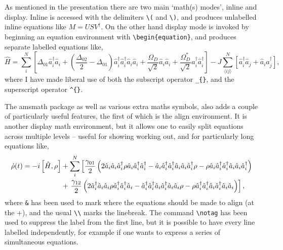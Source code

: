 \documentclass[a4paper,11pt,twoside]{article}		%
\begin{document}
As mentioned in the presentation there are two main `math(s) modes', inline and display. Inline is accessed with the delimiters \verb:\(: and \verb:\):, and produces unlabelled inline equations like \(M = USV^{\dagger}\). On the other hand display mode is invoked by beginning an equation environment with \verb:\begin{equation}:, and produces separate labelled equations like,
\begin{equation}
\hat{H} = \sum_{i}^{N} \left[ \Delta_{01}\hat{a}_{i}^{\dagger}\hat{a}_{i} + \left(\frac{\Delta_{02}}{2} - \Delta_{01}\right)\hat{a}_{i}^{\dagger}\hat{a}_{i}^{\dagger}\hat{a}_{i}\hat{a}_{i} + \frac{\Omega_{D}}{\sqrt{2}}\hat{a}_{i}\hat{a}_{i} + \frac{\Omega_{D}^{*}}{\sqrt{2}}\hat{a}_{i}^{\dagger}\hat{a}_{i}^{\dagger} \right] - J\sum_{\langle ij \rangle}^{N} \left[ \hat{a}_{i}^{\dagger}\hat{a}_{j} + \hat{a}_{i}\hat{a}_{j}^{\dagger}\right],
\label{eq:1}
\end{equation}
where I have made liberal use of both the subscript operator \verb:_{}:, and the superscript operator \verb:^{}:. 

The amsmath package as well as various extra maths symbols, also adds a couple of particularly useful features, the first of which is the align environment. It is another display math environment, but it allows one to easily split equations across multiple levels -- useful for showing working out, and for particularly long equations like,
\begin{align}
\dot{\rho}(t) = -i\left[ \hat{H}, \rho \right] &+ \sum_{i}^{N} \left[ \frac{\gamma_{01}}{2}\left(2\hat{a}_{i}\hat{a}_{i}\hat{a}_{i}^{\dagger} \rho \hat{a}_{i}\hat{a}_{i}^{\dagger}\hat{a}_{i}^{\dagger} - \hat{a}_{i}\hat{a}_{i}^{\dagger}\hat{a}_{i}^{\dagger} \hat{a}_{i}\hat{a}_{i}\hat{a}_{i}^{\dagger} \rho - \rho \hat{a}_{i}\hat{a}_{i}^{\dagger}\hat{a}_{i}^{\dagger} \hat{a}_{i}\hat{a}_{i}\hat{a}_{i}^{\dagger}\right) \right. \notag \\
&+ \left. \frac{\gamma_{12}}{2} \left(2 \hat{a}_{i}^{\dagger}\hat{a}_{i}\hat{a}_{i} \rho \hat{a}_{i}^{\dagger}\hat{a}_{i}^{\dagger}\hat{a}_{i} - \hat{a}_{i}^{\dagger}\hat{a}_{i}^{\dagger}\hat{a}_{i} \hat{a}_{i}^{\dagger}\hat{a}_{i}\hat{a}_{i} \rho - \rho \hat{a}_{i}^{\dagger}\hat{a}_{i}^{\dagger}\hat{a}_{i} \hat{a}_{i}^{\dagger}\hat{a}_{i}\hat{a}_{i} \right) \right],
\label{eq:2}
\end{align}
where \verb:&: has been used to mark where the equations should be made to align (at the +), and the usual \verb:\\: marks the linebreak. The command \verb:\notag: has been used to suppress the label from the first line, but it is possible to have every line labelled independently, for example if one wants to express a series of simultaneous equations.
\end{document}
